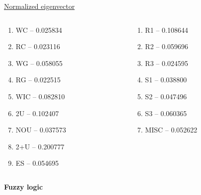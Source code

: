 \documentclass[aspectratio=1610,pdftex,dvipsnames,compress,xcolor={dvipsnames}]{beamer}
\begin{document}
\begin{frame}{\href{https://maps.app.goo.gl/Au6WsY4nKWzXmruq9}{Normalized eigenvector}}
    \begin{columns}[t]

        \begin{column}{0.50\textwidth}
            \begin{enumerate}[series=outerlist,topsep=0pt,itemsep=3pt,leftmargin=*,label=(\arabic*)]
                \item[]WC -- 0.025834   
                \item[]RC -- 0.023116
                \item[]WG -- 0.058055
                \item[]RG -- 0.022515
                \item[]WIC -- 0.082810
                \item[]2U -- 0.102407
                \item[]NOU -- 0.037573
                \item[]2+U -- 0.200777
                \item[]ES -- 0.054695
            \end{enumerate}
        \end{column}

        \begin{column}{0.50\textwidth}
            \begin{enumerate}[series=outerlist,topsep=0pt,itemsep=3pt,leftmargin=*,label=(\arabic*)]
                \item[]R1 -- 0.108644
                \item[]R2 -- 0.059696
                \item[]R3 -- 0.024595
                \item[]S1 -- 0.038800
                \item[]S2 -- 0.047496
                \item[]S3 -- 0.060365 
                \item[]MISC -- 0.052622
            \end{enumerate}
        \end{column}

    \end{columns}
\end{frame}


\begin{frame}[plain]{}
    \centering\LARGE\textbf{Fuzzy logic}
\end{frame}
\end{document}
